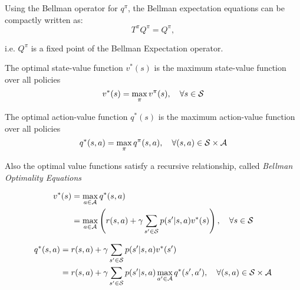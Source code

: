 Using the Bellman operator for $q^\pi$, the Bellman expectation equations can be compactly written as:
\begin{equation*}
    T^\pi Q^\pi = Q^\pi,
\end{equation*}

i.e. $Q^\pi$ is a fixed point of the Bellman Expectation operator.



\begin{definition}
    The optimal state-value function $v^*(s)$ is the maximum state-value function over all policies
    \[v^*(s) = \max_\pi v^\pi(s),\quad \forall s \in \mathcal{S}\]
\end{definition}
\begin{definition}
    The optimal action-value function $q^*(s)$ is the maximum action-value function over all policies
    \[q^*(s,a) = \max_\pi q^\pi(s,a),\quad \forall (s,a) \in \mathcal{S}\times\mathcal{A}\]
\end{definition}

Also the optimal value functions satisfy a recursive relationship, called \textit{Bellman Optimality Equations}

\begin{equation}
    \label{eq:bellman_optimality_v}
    \begin{aligned}
        v^*(s) &= \max_{a \in \mathcal{A}} q^*(s,a) \\
        &= \max_{a \in \mathcal{A}} \left(r(s,a) + \gamma \sum_{s' \in \mathcal{S}}p(s'|s,a)v^*(s)\right),\quad \forall s \in \mathcal{S}
    \end{aligned}
\end{equation}

\begin{equation}
    \label{eq:bellman_optimality_q}
    \begin{aligned}
        q^*(s, a) &= r(s,a) + \gamma \sum_{s' \in \mathcal{S}}p(s'|s,a)v^*(s')  \\
        &= r(s,a) + \gamma \sum_{s' \in \mathcal{S}}p(s'|s,a)\max_{a' \in \mathcal{A}} q^*(s',a'),\quad \forall (s,a) \in \mathcal{S}\times\mathcal{A}
    \end{aligned}
\end{equation}


